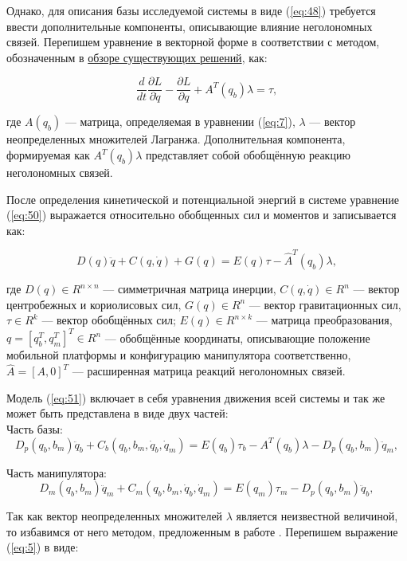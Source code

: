 \documentclass[14pt, a4paper]{extreport}
\begin{document}
Однако, для описания базы исследуемой системы в виде (\ref{eq:48}) требуется ввести дополнительные компоненты, описывающие влияние неголономных связей. Перепишем уравнение в векторной форме в соответствии с методом, обозначенным в \hyperlink{sec:1}{обзоре существующих решений}, как:

\[
\dfrac{d}{dt} \frac{\partial L}{\partial \dot{q}} - \frac{\partial L}{\partial q} + A^T(q_b)\lambda = \tau,
\tag{50} \label{eq:50}
\]

\noindent
где $A(q_b)$ --- матрица, определяемая в уравнении (\ref{eq:7}), $\lambda$ --- вектор неопределенных множителей Лагранжа. Дополнительная компонента, формируемая как $A^T(q_b)\lambda$ представляет собой обобщённую реакцию неголономных связей.

После определения кинетической и потенциальной энергий в системе уравнение (\ref{eq:50}) выражается относительно обобщенных сил и моментов и записывается как:

\[
    D(q)\ddot{q} + C(q,\dot{q}) + G(q) = E(q)\tau - \hat{A}^T(q_b)\lambda, 
	\tag{51} \label{eq:51}
\]

\noindent
где $D(q) \in R^{n\times n}$ --- симметричная матрица инерции, $C(q,\dot{q}) \in R^n$ --- вектор центробежных и кориолисовых сил, $G(q) \in R^n$ --- вектор гравитационных сил, $\tau \in R^k$ --- вектор обобщённых сил; $E(q) \in R^{n\times k}$ --- матрица преобразования, $q = [q_b^T,q_m^T]^T \in R^n$ --- обобщённые координаты, описывающие положение мобильной платформы и конфигурацию манипулятора соответственно, $ \hat{A} = [A, 0]^T$ --- расширенная матрица реакций неголономных связей.

Модель (\ref{eq:51}) включает в себя уравнения движения всей системы и так же может быть представлена в виде двух частей:\\[2mm]
Часть базы:
\begin{equation}
    D_p(q_b, b_m)\ddot{q}_b + C_b(q_b, b_m,\dot{q}_b,\dot{q}_m) = E(q_b)\tau_b - A^T(q_b)\lambda - D_p(q_b, b_m)\ddot{q}_m, 
	\tag{52} \label{eq:52}
\end{equation}

\noindent
Часть манипулятора:
\begin{equation}
    D_m(q_b, b_m)\ddot{q}_m + C_m(q_b, b_m,\dot{q}_b,\dot{q}_m) = E(q_m)\tau_m - D_p(q_b, b_m)\ddot{q}_b,  
	\tag{53} \label{eq:53}
\end{equation}

Так как вектор неопределенных множителей $\lambda$ является неизвестной величиной, то избавимся от него методом, предложенным в работе \cite{Li}. Перепишем выражение (\ref{eq:5}) в виде:
\end{document}
